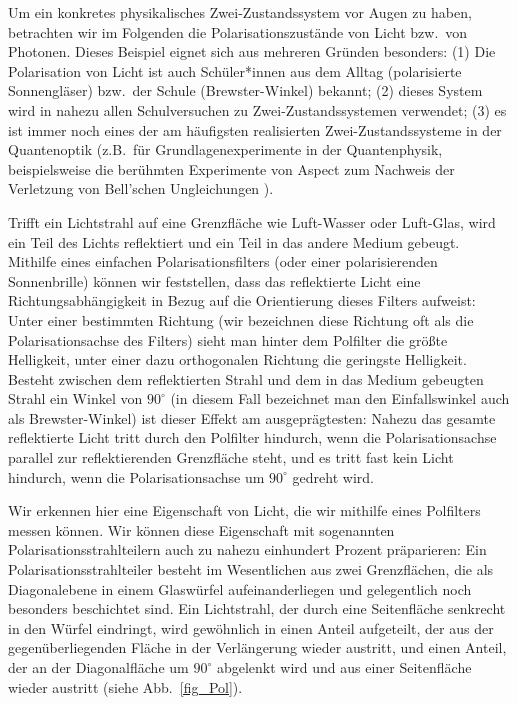 Um ein konkretes physikalisches Zwei-Zustandssystem vor Augen zu haben, betrachten
wir im Folgenden die Polarisationszust\"ande von Licht bzw.\ von Photonen. Dieses Beispiel
eignet sich aus mehreren Gr\"unden besonders: (1) Die Polarisation von Licht ist auch Sch\"uler*innen
aus dem Alltag (polarisierte Sonnengl\"aser) bzw.\ der Schule (Brewster-Winkel) bekannt;
(2) dieses System wird in nahezu allen Schulversuchen zu Zwei-Zustandssystemen verwendet;
(3) es ist immer noch eines der am h\"aufigsten realisierten Zwei-Zustandssysteme in der
Quantenoptik (z.B.\ f\"ur Grundlagenexperimente in der Quantenphysik, beispielsweise die
ber\"uhmten Experimente von Aspect zum Nachweis der Verletzung von Bell'schen Ungleichungen \cite{Aspect}). 

Trifft ein Lichtstrahl auf eine Grenzfl\"ache wie Luft-Wasser oder Luft-Glas,
wird ein Teil des Lichts reflektiert und ein Teil in das andere Medium gebeugt. Mithilfe eines
einfachen Polarisationsfilters (oder einer polarisierenden Sonnenbrille) k\"onnen wir feststellen, dass
das reflektierte Licht eine Richtungsabh\"angigkeit in Bezug auf die Orientierung dieses
Filters aufweist: Unter einer bestimmten Richtung (wir bezeichnen diese Richtung oft als
die Polarisationsachse des Filters) sieht man hinter dem Polfilter die gr\"o\ss te Helligkeit,
unter einer dazu orthogonalen Richtung die geringste Helligkeit. Besteht zwischen dem
reflektierten Strahl und dem in das Medium gebeugten Strahl ein Winkel von $90^\circ$
(in diesem Fall bezeichnet man den Einfallswinkel auch als Brewster-Winkel) ist dieser
Effekt am ausgepr\"agtesten: Nahezu das gesamte reflektierte Licht tritt durch den Polfilter
hindurch, wenn die Polarisationsachse parallel zur reflektierenden Grenzfl\"ache steht, und
es tritt fast kein Licht hindurch, wenn die Polarisationsachse um $90^\circ$ gedreht wird.  

Wir erkennen hier eine Eigenschaft von Licht, die wir mithilfe eines Polfilters messen
k\"onnen. Wir k\"onnen diese Eigenschaft mit sogenannten Polarisationsstrahlteilern
auch zu nahezu einhundert Prozent pr\"aparieren: Ein Polarisationsstrahlteiler besteht im
Wesentlichen aus zwei Grenzfl\"achen, die als Diagonalebene in einem Glasw\"urfel
aufeinanderliegen und gelegentlich noch besonders beschichtet sind. Ein Lichtstrahl,
der durch eine Seitenfl\"ache senkrecht in den W\"urfel eindringt, wird gew\"ohnlich in einen
Anteil aufgeteilt, der aus der gegen\"uberliegenden Fl\"ache in der Verl\"angerung wieder austritt,
und einen Anteil, der an der Diagonalfl\"ache um $90^\circ$ abgelenkt wird und aus einer
Seitenfl\"ache wieder austritt (siehe Abb.\ \ref{fig_Pol}). 

